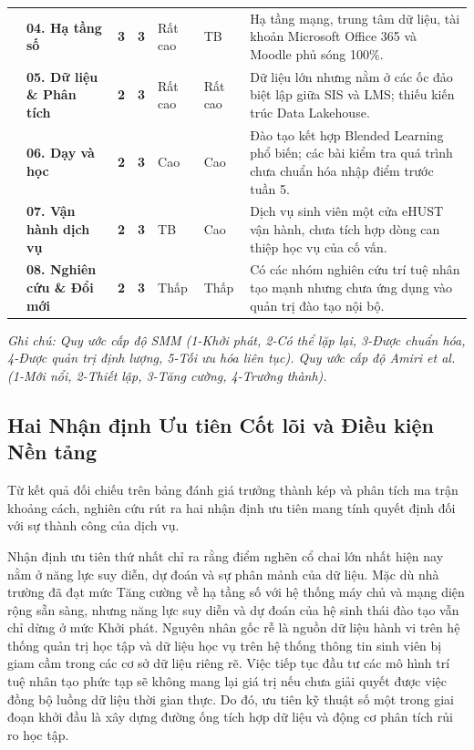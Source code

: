 \begin{table}[htbp]
\begin{tabularx}{\textwidth}{|L{2.0cm}|L{2.8cm}|C{1.1cm}|C{1.1cm}|C{1.4cm}|C{1.1cm}|Y|}
& \textbf{04. Hạ tầng số} & \textbf{3} & \textbf{3} & Rất cao & TB & Hạ tầng mạng, trung tâm dữ liệu, tài khoản Microsoft Office 365 và Moodle phủ sóng 100\%. \\
& \textbf{05. Dữ liệu \& Phân tích} & \textbf{2} & \textbf{3} & Rất cao & Rất cao & Dữ liệu lớn nhưng nằm ở các ốc đảo biệt lập giữa SIS và LMS; thiếu kiến trúc Data Lakehouse. \\
& \textbf{06. Dạy và học} & \textbf{2} & \textbf{3} & Cao & Cao & Đào tạo kết hợp Blended Learning phổ biến; các bài kiểm tra quá trình chưa chuẩn hóa nhập điểm trước tuần 5. \\
& \textbf{07. Vận hành dịch vụ} & \textbf{2} & \textbf{3} & TB & Cao & Dịch vụ sinh viên một cửa eHUST vận hành, chưa tích hợp dòng can thiệp học vụ của cố vấn. \\
& \textbf{08. Nghiên cứu \& Đổi mới} & \textbf{2} & \textbf{3} & Thấp & Thấp & Có các nhóm nghiên cứu trí tuệ nhân tạo mạnh nhưng chưa ứng dụng vào quản trị đào tạo nội bộ. \\
\hline
\end{tabularx}
\begin{flushleft}
\textit{\fontsize{8}{10}\selectfont Ghi chú: Quy ước cấp độ SMM (1-Khởi phát, 2-Có thể lặp lại, 3-Được chuẩn hóa, 4-Được quản trị định lượng, 5-Tối ưu hóa liên tục). Quy ước cấp độ Amiri et al. (1-Mới nổi, 2-Thiết lập, 3-Tăng cường, 4-Trưởng thành).}
\end{flushleft}
\end{table}

\subsection{Hai Nhận định Ưu tiên Cốt lõi và Điều kiện Nền tảng}
Từ kết quả đối chiếu trên bảng đánh giá trưởng thành kép và phân tích ma trận khoảng cách, nghiên cứu rút ra hai nhận định ưu tiên mang tính quyết định đối với sự thành công của dịch vụ.

Nhận định ưu tiên thứ nhất chỉ ra rằng điểm nghẽn cổ chai lớn nhất hiện nay nằm ở năng lực suy diễn, dự đoán và sự phân mảnh của dữ liệu. Mặc dù nhà trường đã đạt mức Tăng cường về hạ tầng số với hệ thống máy chủ và mạng diện rộng sẵn sàng, nhưng năng lực suy diễn và dự đoán của hệ sinh thái đào tạo vẫn chỉ dừng ở mức Khởi phát. Nguyên nhân gốc rễ là nguồn dữ liệu hành vi trên hệ thống quản trị học tập và dữ liệu học vụ trên hệ thống thông tin sinh viên bị giam cầm trong các cơ sở dữ liệu riêng rẽ. Việc tiếp tục đầu tư các mô hình trí tuệ nhân tạo phức tạp sẽ không mang lại giá trị nếu chưa giải quyết được việc đồng bộ luồng dữ liệu thời gian thực. Do đó, ưu tiên kỹ thuật số một trong giai đoạn khởi đầu là xây dựng đường ống tích hợp dữ liệu và động cơ phân tích rủi ro học tập.

